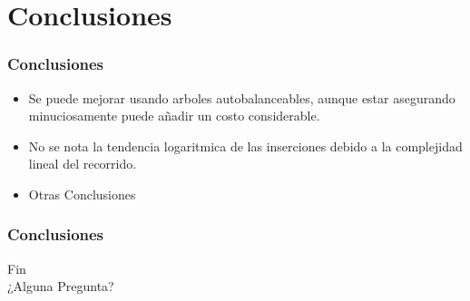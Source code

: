 \documentclass{beamer}
\begin{document}
\section{Conclusiones}
	\begin{frame}
		\frametitle{Conclusiones}
			\begin{itemize}[<+->]
				\item Se puede mejorar usando arboles autobalanceables, aunque estar asegurando minuciosamente puede añadir un costo considerable.
				\item No se nota la tendencia logaritmica de las inserciones debido a la complejidad lineal del recorrido.
			\item Otras Conclusiones
			\end{itemize}
	\end{frame}

	\begin{frame}
		\frametitle{Conclusiones}
		\begin{center}
\Huge
Fin\\
¿Alguna Pregunta?
		\end{center}	
	\end{frame}
\end{document}

